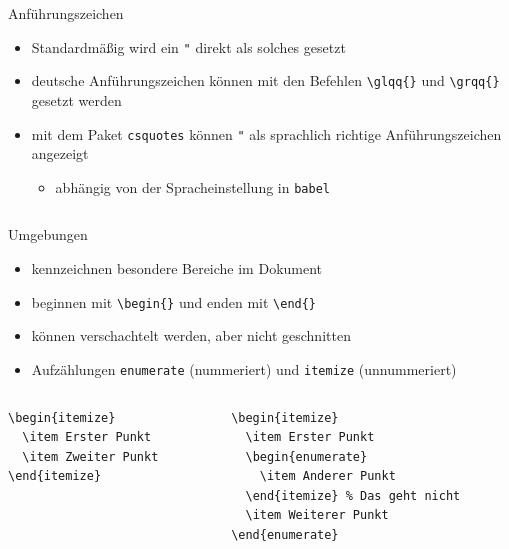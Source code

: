 \documentclass[presentation,aspectratio=169]{beamer}
\begin{document}
\maketitle

\begin{frame}[fragile]{Anführungszeichen}
  \begin{itemize}
    \item Standardmäßig wird ein \verb|"| direkt als solches gesetzt
    \item deutsche Anführungszeichen können mit den Befehlen \verb|\glqq{}| und \verb|\grqq{}| gesetzt werden
    \item mit dem Paket \verb|csquotes| können \verb|"| als sprachlich richtige Anführungszeichen angezeigt
      \begin{itemize}
        \item abhängig von der Spracheinstellung in \verb|babel|
      \end{itemize}
    \inputminted{latex}{codebeispiele/quotation.tex}
  \end{itemize}
\end{frame}

\begin{frame}[fragile]{Umgebungen}
  \begin{itemize}
    \item kennzeichnen besondere Bereiche im Dokument
    \item beginnen mit \verb|\begin{}| und enden mit \verb|\end{}|
    \item können verschachtelt werden, aber nicht geschnitten
    \item Aufzählungen \verb|enumerate| (nummeriert) und \verb|itemize| (unnummeriert)
  \end{itemize}
  \begin{columns}[t]
    \begin{column}{.3\textwidth}
      \centering
      \begin{verbatim}
\begin{itemize}
  \item Erster Punkt
  \item Zweiter Punkt
\end{itemize}
      \end{verbatim}
    \end{column}
    \begin{column}{.5\textwidth}
      \centering
      \begin{verbatim}
\begin{itemize}
  \item Erster Punkt
  \begin{enumerate}
    \item Anderer Punkt
  \end{itemize} % Das geht nicht
  \item Weiterer Punkt
\end{enumerate}
      \end{verbatim}
    \end{column}
  \end{columns}
\end{frame}
\end{document}
